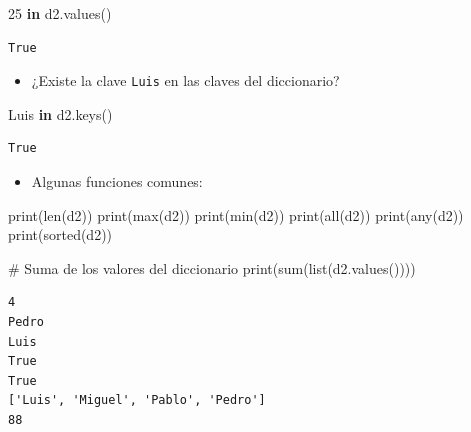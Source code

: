 \documentclass[
  spanish,
  letterpaper,
]{scrbook}
\newenvironment{Shaded}{\begin{snugshade}}{\end{snugshade}}
\newcommand{\BuiltInTok}[1]{\textcolor[rgb]{0.00,0.23,0.31}{#1}}
\newcommand{\CommentTok}[1]{\textcolor[rgb]{0.37,0.37,0.37}{#1}}
\newcommand{\DecValTok}[1]{\textcolor[rgb]{0.68,0.00,0.00}{#1}}
\newcommand{\KeywordTok}[1]{\textcolor[rgb]{0.00,0.23,0.31}{\textbf{#1}}}
\newcommand{\NormalTok}[1]{\textcolor[rgb]{0.00,0.23,0.31}{#1}}
\providecommand{\tightlist}{%
  \setlength{\itemsep}{0pt}\setlength{\parskip}{0pt}}
\theoremstyle{definition}
\theoremstyle{remark}
\begin{document}
\begin{Shaded}
\begin{Highlighting}[]
\DecValTok{25} \KeywordTok{in}\NormalTok{ d2.values()}
\end{Highlighting}
\end{Shaded}

\begin{verbatim}
True
\end{verbatim}

\begin{itemize}
\tightlist
\item
  ¿Existe la clave \texttt{\textquotesingle{}Luis\textquotesingle{}} en
  las claves del diccionario?
\end{itemize}

\begin{Shaded}
\begin{Highlighting}[]
\CommentTok{\textquotesingle{}Luis\textquotesingle{}} \KeywordTok{in}\NormalTok{ d2.keys()}
\end{Highlighting}
\end{Shaded}

\begin{verbatim}
True
\end{verbatim}

\begin{itemize}
\tightlist
\item
  Algunas funciones comunes:
\end{itemize}

\begin{Shaded}
\begin{Highlighting}[]
\BuiltInTok{print}\NormalTok{(}\BuiltInTok{len}\NormalTok{(d2))}
\BuiltInTok{print}\NormalTok{(}\BuiltInTok{max}\NormalTok{(d2))}
\BuiltInTok{print}\NormalTok{(}\BuiltInTok{min}\NormalTok{(d2))}
\BuiltInTok{print}\NormalTok{(}\BuiltInTok{all}\NormalTok{(d2))}
\BuiltInTok{print}\NormalTok{(}\BuiltInTok{any}\NormalTok{(d2))}
\BuiltInTok{print}\NormalTok{(}\BuiltInTok{sorted}\NormalTok{(d2))}

\CommentTok{\# Suma de los valores del diccionario}
\BuiltInTok{print}\NormalTok{(}\BuiltInTok{sum}\NormalTok{(}\BuiltInTok{list}\NormalTok{(d2.values())))}
\end{Highlighting}
\end{Shaded}

\begin{verbatim}
4
Pedro
Luis
True
True
['Luis', 'Miguel', 'Pablo', 'Pedro']
88
\end{verbatim}
\end{document}
